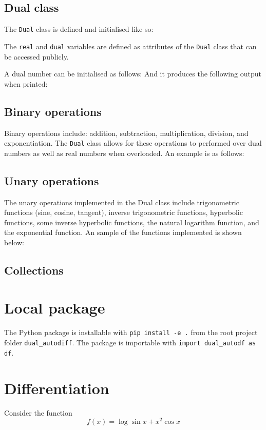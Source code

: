 \documentclass[11pt,a4paper]{article}
\begin{document}
\subsection{Dual class}
The \texttt{Dual} class is defined and initialised like so:

The \texttt{real} and \texttt{dual} variables are defined as attributes of the \texttt{Dual} class that can be accessed publicly.

A dual number can be initialised as follows:
And it produces the following output when printed:
\subsection{Binary operations}
Binary operations include: addition, subtraction, multiplication, division, and exponentiation. The \texttt{Dual} class allows for these operations to performed over dual numbers as well as real numbers when overloaded.
An example is as follows:
\subsection{Unary operations}
The unary operations implemented in the Dual class include trigonometric functions (sine, cosine, tangent), inverse trigonometric functions, hyperbolic functions, some inverse hyperbolic functions, the natural logarithm function, and the exponential function.
An sample of the functions implemented is shown below:

\subsection{Collections}


\section{Local package}
The Python package is installable with \texttt{pip install -e .} from the root project folder \texttt{dual\_autodiff}. The package is importable with \texttt{import dual\_autodf as df}.

\section{Differentiation}
Consider the function
\begin{equation}
    f(x) = \log{\sin{x}} + x^2 \cos{x}
    \label{eq:func}
\end{equation}
\end{document}
